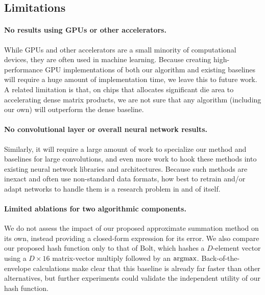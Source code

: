 \subsection{Limitations}


\vspace{-1.5mm}
\paragraph{No results using GPUs or other accelerators.} While GPUs and other accelerators are a small minority of computational devices, they are often used in machine learning. Because creating high-performance GPU implementations of both our algorithm and existing baselines will require a huge amount of implementation time, we leave this to future work. A related limitation is that, on chips that allocates significant die area to accelerating dense matrix products, we are not sure that any algorithm (including our own) will outperform the dense baseline.
%
\vspace{-1.5mm}
\paragraph{No convolutional layer or overall neural network results.} Similarly, it will require a large amount of work to specialize our method and baselines for large convolutions, and even more work to hook these methods into existing neural network libraries and architectures. Because such methods are inexact and often use non-standard data formats, how best to retrain and/or adapt networks to handle them is a research problem in and of itself.
%
\vspace{-1.5mm}
\paragraph{Limited ablations for two algorithmic components.}
We do not assess the impact of our proposed approximate summation method on its own, instead providing a closed-form expression for its error. We also compare our proposed hash function only to that of Bolt, %
which hashes a $D$-element vector using a $D \times 16$ matrix-vector multiply followed by an $\operatorname*{argmax}$. Back-of-the-envelope calculations make clear that this baseline is already far faster than other alternatives, but further experiments could validate the independent utility of our hash function.
\vspace{-1.5mm}

